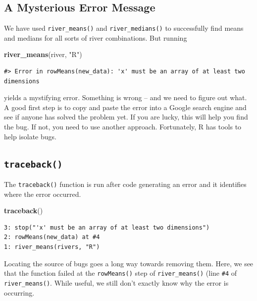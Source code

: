 \documentclass[
]{book}
\newenvironment{Shaded}{\begin{snugshade}}{\end{snugshade}}
\newcommand{\KeywordTok}[1]{\textcolor[rgb]{0.13,0.29,0.53}{\textbf{#1}}}
\newcommand{\NormalTok}[1]{#1}
\newcommand{\StringTok}[1]{\textcolor[rgb]{0.31,0.60,0.02}{#1}}
\begin{document}
\hypertarget{a-mysterious-error-message}{%
\subsection{A Mysterious Error Message}\label{a-mysterious-error-message}}

We have used \texttt{river\_means()} and \texttt{river\_medians()} to successfully find means and medians for all sorts of river combinations. But running

\begin{Shaded}
\begin{Highlighting}[]
\KeywordTok{river_means}\NormalTok{(river, }\StringTok{"R"}\NormalTok{)}
\end{Highlighting}
\end{Shaded}

\begin{verbatim}
#> Error in rowMeans(new_data): 'x' must be an array of at least two dimensions
\end{verbatim}

yields a mystifying error. Something is wrong -- and we need to figure out what. A good first step is to copy and paste the error into a Google search engine and see if anyone has solved the problem yet. If you are lucky, this will help you find the bug. If not, you need to use another approach. Fortunately, R has tools to help isolate bugs.

\hypertarget{traceback}{%
\subsection{\texorpdfstring{\texttt{traceback()}}{traceback()}}\label{traceback}}

The \texttt{traceback()} function is run after code generating an error and it identifies where the error occurred.

\begin{Shaded}
\begin{Highlighting}[]
\KeywordTok{traceback}\NormalTok{()}
\end{Highlighting}
\end{Shaded}

\begin{verbatim}
3: stop("'x' must be an array of at least two dimensions")
2: rowMeans(new_data) at #4
1: river_means(rivers, "R")
\end{verbatim}

Locating the source of bugs goes a long way towards removing them. Here, we see that the function failed at the \texttt{rowMeans()} step of \texttt{river\_means()} (line \texttt{\#4} of \texttt{river\_means()}. While useful, we still don't exactly know why the error is occurring.
\end{document}
